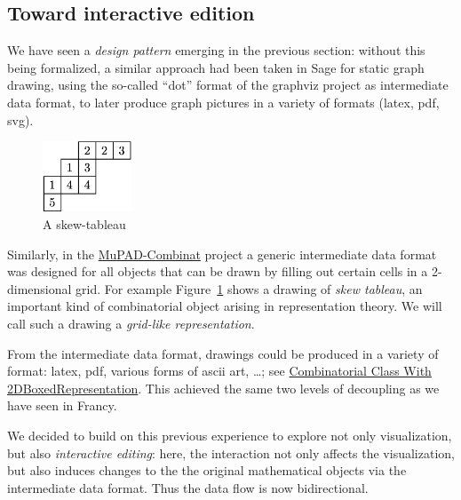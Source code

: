 \documentclass{deliverablereport}
\begin{document}


\subsection{Toward interactive edition}
\label{section:editing}

We have seen a \emph{design pattern} emerging in the previous section:
without this being formalized, a similar approach had been taken in
Sage for static graph drawing, using the so-called ``dot'' format of
the graphviz project as intermediate data format, to later produce
graph pictures in a variety of formats (latex, pdf, svg).

\begin{figure}
  \includegraphics[width=100px]{images/JDTSlide}
  \caption{A skew-tableau}
  \label{fig:skew_tableau}
\end{figure}
Similarly, in the
\href{http://mupad-combinat.sourceforge.net}{MuPAD-Combinat} project a
generic intermediate data format was designed for all objects that can
be drawn by filling out certain cells in a 2-dimensional grid. For
example Figure~\ref{fig:skew_tableau} shows a drawing of \emph{skew
  tableau}, an important kind of combinatorial object arising in
representation theory.
We will call such a drawing a \emph{grid-like representation}.


From the intermediate data format, drawings could be produced in a
variety of format: latex, pdf, various forms of ascii art, \dots; see
\href{http://mupad-combinat.sourceforge.net/doc/en/Cat_Combinat/CombinatorialClassWith2DBoxedRepresentation.html}{Combinatorial Class With 2DBoxedRepresentation}.
This achieved the same two levels of decoupling as we have seen in Francy.

We decided to build on this previous experience to explore not only
visualization, but also \emph{interactive editing}: here, the interaction
not only affects the visualization, but also induces changes to the
the original mathematical objects via the intermediate data format.
Thus the data flow is now bidirectional.
\end{document}

